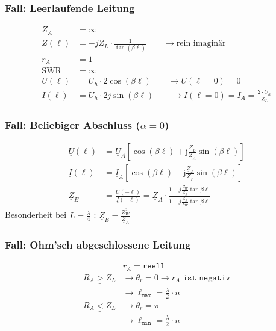 \subsubsection{Fall: Leerlaufende Leitung}
\begin{align*}
    Z_A          & = \infty                                                                         \\
    Z(\ell)         & = -jZ_L\cdot \frac{1}{\tan (\beta \ell)} \qquad\rightarrow\text{rein imaginär}                 \\
    r_A          & = 1                                                                              \\
    \mathrm{SWR} & = \infty                                                                         \\
    U(\ell)         & = U_h\cdot 2\cos(\beta \ell) \qquad\rightarrow U(\ell=0)=0                             \\
    I(\ell)         & = U_h\cdot 2j\sin(\beta \ell) \qquad\rightarrow I(\ell=0)=I_A = \frac{2\cdot U_h}{Z_L}
\end{align*}

\subsubsection{Fall: Beliebiger Abschluss ($\alpha = 0$)}
\begin{align*}
    \underline{U}(\ell) &= \underline{U}_A\left[\cos (\beta \ell)+\mathrm{j} \frac{\underline{Z}_L}{\underline{Z}_A} \sin (\beta \ell)\right] \\
    \underline{I}(\ell) &= \underline{I}_A\left[\cos (\beta \ell)+\mathrm{j} \frac{\underline{Z}_A}{\underline{Z}_L} \sin (\beta \ell)\right] \\
    \underline{Z}_E     &= \frac{U(-\ell)}{\underline{I}(-\ell)}= \underline{Z}_A \cdot \frac{1+j \frac{Z_W}{\underline{Z}_A} \tan \beta \ell}{1+j \frac{\underline{Z}_A}{Z_W} \tan \beta \ell} 
\end{align*}
Besonderheit bei $L=\frac{\lambda}{4}$ :
$ \underline{Z}_E=\frac{Z_{W}^2}{\underline{Z}_A}$

\subsubsection{Fall: Ohm'sch abgeschlossene Leitung}
\begin{align*}
                          & r_A = \texttt{reell} \\
    \underline{R_A > Z_L} & \rightarrow\theta_r = 0 \rightarrow r_A \texttt{ ist negativ} \\
                          & \rightarrow \ell_\texttt{max}=\frac{\lambda}{2}\cdot n \\
    \underline{R_A < Z_L} & \rightarrow\theta_r = \pi                           \\
                          & \rightarrow \ell_\texttt{min}=\frac{\lambda}{2}\cdot n
\end{align*}

